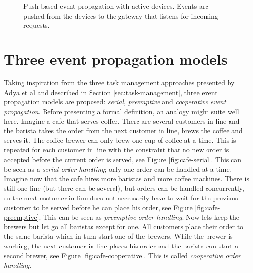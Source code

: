 \begin{figure}[h!]
    \centering
    \caption[Push-based event propagation.]{Push-based event propagation with
    active devices. Events are pushed from the devices to the gateway that
    listens for incoming requests.}
    \label{fig:push-based}
\end{figure}

\section{Three event propagation models}

Taking inspiration from the three task management approaches presented by Adya
et al \cite{adya2002cooperative} and described in Section
\ref{sec:task-management}, three event propagation models are proposed:
\textit{serial}, \textit{preemptive} and \textit{cooperative event
propagation}. Before presenting a formal definition, an analogy might suite
well here. Imagine a cafe that serves coffee. There are several customers in
line and the barista takes the order from the next customer in line, brews the
coffee and serves it. The coffee brewer can only brew one cup of coffee at a
time. This is repeated for each customer in line with the constraint that no
new order is accepted before the current order is served, see Figure
\ref{fig:cafe-serial}. This can be seen as a \textit{serial order handling};
only one order can be handled at a time. Imagine now that the cafe hires more
baristas and more coffee machines. There is still one line (but there can be
several), but orders can be handled concurrently, so the next customer in line
does not necessarily have to wait for the previous customer to be served before
he can place his order, see Figure \ref{fig:cafe-preemptive}. This can be seen
as \textit{preemptive order handling}. Now lets keep the brewers but let go all
baristas except for one.  All customers place their order to the same barista
which in turn start one of the brewers. While the brewer is working, the next
customer in line places his order and the barista can start a second brewer,
see Figure \ref{fig:cafe-cooperative}. This is called \textit{cooperative order
handling}.

